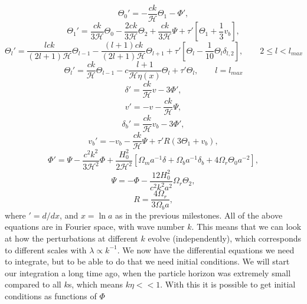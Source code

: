 \documentclass[a4paper,norsk, 10pt]{article}
\begin{document}
\begin{equation}
\Theta_0 ' = -\frac{ck}{\mathcal{H}}\Theta_1 - \Phi',
\end{equation}
\begin{equation}
\Theta_1' = \frac{ck}{3\mathcal{H}}\Theta_0 - \frac{2ck}{3\mathcal{H}}\Theta_2 + \frac{ck}{3\mathcal{H}}\Psi + \tau'\left[\Theta_1 + \frac{1}{3}v_b\right],
\end{equation}
\begin{equation}
\Theta_l' = \frac{lck}{(2l+1)\mathcal{H}}\Theta_{l-1} - \frac{(l+1)ck}{(2l+1)\mathcal{H}}\Theta_{l+1} + \tau'\left[\Theta_l - \frac{1}{10}\Theta_l \delta_{l,2}\right],\qquad 2 \leq l < l_{max}
\end{equation}
\begin{equation}
\Theta_l' = \frac{ck}{\mathcal{H}}\Theta_{l-1} - c\frac{l+1}{\mathcal{H}\eta(x)}\Theta_l + \tau'\Theta_l, \qquad l = l_{max}
\end{equation}
\begin{equation}
\delta' = \frac{ck}{\mathcal{H}}v - 3\Phi',
\end{equation}
\begin{equation}
v' = -v - \frac{ck}{\mathcal{H}}\Psi,
\end{equation}
\begin{equation}
\delta_b' = \frac{ck}{\mathcal{H}}v_b -3\Phi',
\end{equation}
\begin{equation}
v_b' = -v_b - \frac{ck}{\mathcal{H}}\Psi + \tau' R(3\Theta_1 + v_b),
\end{equation}
\begin{equation}
\Phi' = \Psi - \frac{c^2k^2}{3\mathcal{H}^2}\Phi + \frac{H_0^2}{2\mathcal{H}^2}\left[\Omega_ma^{-1}\delta + \Omega_b a^{-1}\delta_b + 4\Omega_r\Theta_0 a^{-2}\right],
\end{equation}
\begin{equation}
\Psi = -\Phi - \frac{12H_0^2}{c^2k^2a^2}\Omega_r\Theta_2,
\end{equation}
\begin{equation}
R = \frac{4\Omega_r}{3\Omega_b a},
\end{equation}
where $' = d/dx$, and $x = \ln a$ as in the previous milestones. All of the above equations are in Fourier space, with wave number $k$. This means that we can look at how the perturbations at different $k$ evolve (independently), which corresponds to different scales with $\lambda \propto k^{-1}$. We now have the differential equations we need to integrate, but to be able to do that we need initial conditions. We will start our integration a long time ago, when the particle horizon was extremely small compared to all $k$s, which means $k\eta << 1$. With this it is possible to get initial conditions as functions of $\Phi$
\end{document}
